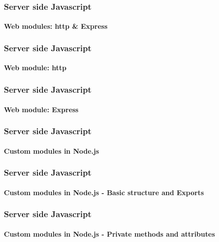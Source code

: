 \documentclass{beamer}
\begin{document}
	\begin{frame}
		\frametitle{Server side Javascript}
		\framesubtitle{Web modules: http \& Express}
	\end{frame}
	\begin{frame}
		\frametitle{Server side Javascript}
		\framesubtitle{Web module: http}
	\end{frame}
	\begin{frame}
		\frametitle{Server side Javascript}
		\framesubtitle{Web module: Express}
	\end{frame}
	\begin{frame}
		\frametitle{Server side Javascript}
		\framesubtitle{Custom modules in Node.js}
	\end{frame}
	\begin{frame}
		\frametitle{Server side Javascript}
		\framesubtitle{Custom modules in Node.js - Basic structure and Exports}
	\end{frame}
	\begin{frame}
		\frametitle{Server side Javascript}
		\framesubtitle{Custom modules in Node.js - Private methods and attributes}
	\end{frame}
\end{document}

